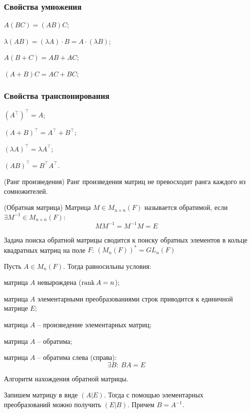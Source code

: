 \begin{multicols}{2}
\subsubsection*{Свойства умножения}
\begin{enumerate*}
    \item $A(BC) = (AB)C$;
    \item $\lambda (AB) = (\lambda A)\cdot B = A\cdot (\lambda B)$;
    \item $A(B+C) = AB+AC$;
    \item $(A+B)C = AC+BC$;
\end{enumerate*}
\subsubsection*{Свойства транспонирования}
\begin{enumerate*}
    \item $(A^\intercal)^\intercal = A$;
    \item $(A+B)^\intercal = A^\intercal + B^\intercal$;
    \item $(\lambda A)^\intercal = \lambda A^\intercal$;
    \item $(AB)^\intercal = B^\intercal A^\intercal$.
\end{enumerate*}
\begin{theorema}{(Ранг произведения)}{}
    Ранг произведения матриц не превосходит ранга каждого из сомножителей.
\end{theorema}
\begin{definition}{(Обратная матрица)}{}
    Матрица $M \in M_{n\times n}(F)$ называется обратимой, если $\exists M^{-1} \in M_{n\times n}(F)$:
    \[
        MM^{-1} = M^{-1}M = E
        \]
\end{definition}
Задача поиска обратной матрицы сводится к поиску обратных элементов в кольце квадратных матриц на поле $F$: $\left(M_n(F)\right)^* = GL_n(F)$
\begin{theorema}{}{}
    Пусть $A \in M_n(F)$. Тогда равносильны условия:
    \begin{enumerate*}
        \item матрица $A$ невырождена ($\rank A = n$);
        \item матрица $A$ элементарными преобразованиями строк приводится к единичной матрице $E$;
        \item матрица $A$ -- произведение элементарных матриц;
        \item матрица $A$ -- обратима;
        \item матрица $A$ -- обратима слева (справа):
        \[
            \exists B: \ BA = E
            \]
    \end{enumerate*}
\end{theorema}
Алгоритм нахождения обратной матрицы.\par
Запишем матрицу в виде $(A|E)$. Тогда с помощью элементарных преобразований можно получить $(E|B)$. Причем $B = A^{-1}.$

\end{multicols}

